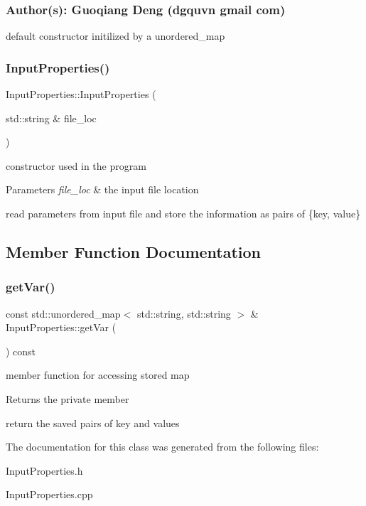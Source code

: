 \subsubsection*{Author(s)\+: Guoqiang Deng (dgquvn  gmail  com) }

default constructor initilized by a unordered\+\_\+map \mbox{\label{a00634_a1eadd0414adf7b9cf3cb6caebdcafd19}} 
\subsubsection{\texorpdfstring{Input\+Properties()}{InputProperties()}\hspace{0.1cm}{\footnotesize\ttfamily [2/2]}}
{\footnotesize\ttfamily Input\+Properties\+::\+Input\+Properties (\begin{DoxyParamCaption}\item[{std\+::string \&}]{file\+\_\+loc }\end{DoxyParamCaption})}

constructor used in the program 
\begin{DoxyParams}{Parameters}
{\em file\+\_\+loc} & the input file location\\
\hline
\end{DoxyParams}
read parameters from input file and store the information as pairs of \{key, value\} 

\subsection{Member Function Documentation}
\mbox{\label{a00634_a8a7f30b41d879975f0366ad50b4a4743}} 
\subsubsection{\texorpdfstring{get\+Var()}{getVar()}}
{\footnotesize\ttfamily const std\+::unordered\+\_\+map$<$ std\+::string, std\+::string $>$ \& Input\+Properties\+::get\+Var (\begin{DoxyParamCaption}{ }\end{DoxyParamCaption}) const}

member function for accessing stored map \begin{DoxyReturn}{Returns}
the private member
\end{DoxyReturn}
return the saved pairs of key and values 

The documentation for this class was generated from the following files\+:\begin{DoxyCompactItemize}
\item 
Input\+Properties.\+h\item 
Input\+Properties.\+cpp\end{DoxyCompactItemize}
